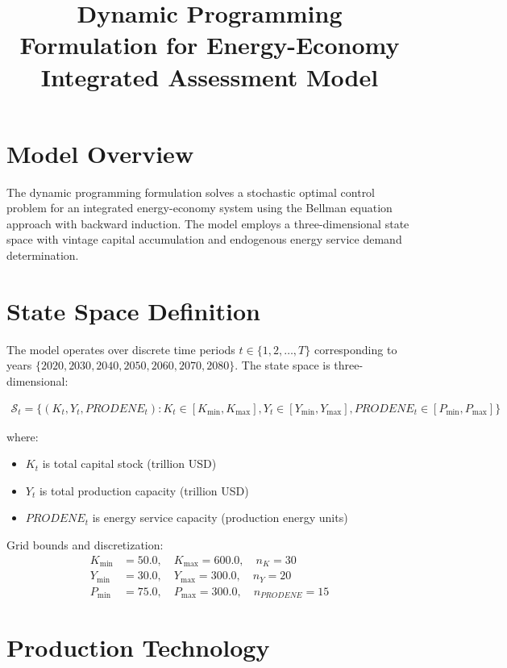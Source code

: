 \documentclass{article}
\title{Dynamic Programming Formulation for Energy-Economy Integrated Assessment Model}
\author{}
\date{}
\begin{document}
\maketitle

\section{Model Overview}

The dynamic programming formulation solves a stochastic optimal control problem for an integrated energy-economy system using the Bellman equation approach with backward induction. The model employs a three-dimensional state space with vintage capital accumulation and endogenous energy service demand determination.

\section{State Space Definition}

The model operates over discrete time periods $t \in \{1, 2, \ldots, T\}$ corresponding to years $\{2020, 2030, 2040, 2050, 2060, 2070, 2080\}$. The state space is three-dimensional:

\begin{align}
\mathcal{S}_t = \{(K_t, Y_t, PRODENE_t) : K_t \in [K_{\min}, K_{\max}], Y_t \in [Y_{\min}, Y_{\max}], PRODENE_t \in [P_{\min}, P_{\max}]\}
\end{align}

where:
\begin{itemize}
\item $K_t$ is total capital stock (trillion USD)
\item $Y_t$ is total production capacity (trillion USD) 
\item $PRODENE_t$ is energy service capacity (production energy units)
\end{itemize}

Grid bounds and discretization:
\begin{align}
K_{\min} &= 50.0, \quad K_{\max} = 600.0, \quad n_K = 30 \\
Y_{\min} &= 30.0, \quad Y_{\max} = 300.0, \quad n_Y = 20 \\
P_{\min} &= 75.0, \quad P_{\max} = 300.0, \quad n_{PRODENE} = 15
\end{align}

\section{Production Technology}
\end{document}
